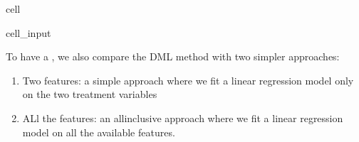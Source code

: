 \documentclass[letterpaper,10pt,english]{jupyterBook}
\begin{document}
\begin{sphinxuseclass}{cell}
\begin{sphinxVerbatimInput}
\begin{sphinxuseclass}{cell_input}
\begin{sphinxVerbatim}[commandchars=\\\{\}]
              \PYG{p}{[} \PYG{p}{]} 

         

      
\end{sphinxVerbatim}

\end{sphinxuseclass}\end{sphinxVerbatimInput}

\end{sphinxuseclass}
\sphinxAtStartPar
To have a , we also compare the DML method with two simpler approaches:
\begin{enumerate}
%
\item {} 
\sphinxAtStartPar
Two features: a simple approach where we fit a linear regression model only on the two treatment variables

\item {} 
\sphinxAtStartPar
ALl the features: an all\sphinxhyphen{}inclusive approach where we fit a linear regression model on all the available features.

\end{enumerate}
\end{document}
